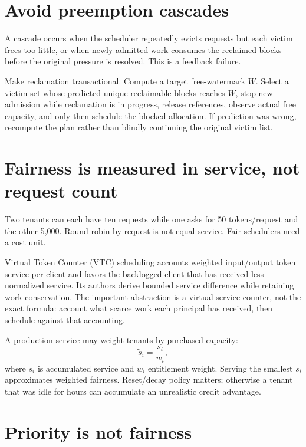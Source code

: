 \section{Avoid preemption cascades}

A cascade occurs when the scheduler repeatedly evicts requests but each victim frees
too little, or when newly admitted work consumes the reclaimed blocks before the
original pressure is resolved. This is a feedback failure.

Make reclamation transactional. Compute a target free-watermark $W$. Select a victim
set whose predicted unique reclaimable blocks reaches $W$, stop new admission while
reclamation is in progress, release references, observe actual free capacity, and
only then schedule the blocked allocation. If prediction was wrong, recompute the
plan rather than blindly continuing the original victim list.


\section{Fairness is measured in service, not request count}

Two tenants can each have ten requests while one asks for 50 tokens/request and the
other 5,000. Round-robin by request is not equal service. Fair schedulers need a cost
unit.

Virtual Token Counter (VTC) scheduling accounts weighted input/output token service
per client and favors the backlogged client that has received less normalized service.
Its authors derive bounded service difference while retaining work conservation. The
important abstraction is a virtual service counter, not the exact formula: account
what scarce work each principal has received, then schedule against that accounting.

A production service may weight tenants by purchased capacity:
\[
\tilde s_i=\frac{s_i}{w_i},
\]
where $s_i$ is accumulated service and $w_i$ entitlement weight. Serving the smallest
$\tilde s_i$ approximates weighted fairness. Reset/decay policy matters; otherwise a
tenant that was idle for hours can accumulate an unrealistic credit advantage.

\section{Priority is not fairness}

